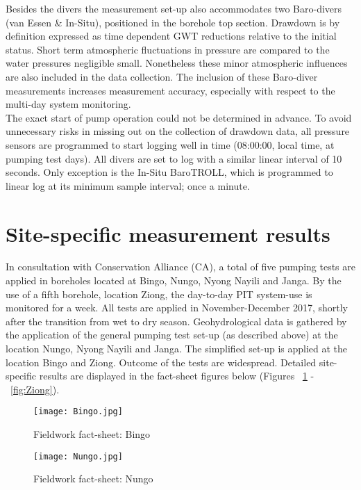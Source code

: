 Besides the divers the measurement set-up also accommodates two Baro-divers (van Essen \& In-Situ), positioned in the borehole top section. Drawdown is by definition expressed as time dependent GWT reductions relative to the initial status. Short term atmospheric fluctuations in pressure are compared to the water pressures negligible small. Nonetheless these minor atmospheric influences are also included in the data collection. The inclusion of these Baro-diver measurements increases measurement accuracy, especially with respect to the multi-day system monitoring.
\bigskip \\
The exact start of pump operation could not be determined in advance. To avoid unnecessary risks in missing out on the collection of drawdown data, all pressure sensors are programmed to start logging well in time (08:00:00, local time, at pumping test days). All divers are set to log with a similar linear interval of 10 seconds. Only exception is the In-Situ BaroTROLL, which is programmed to linear log at its minimum sample interval; once a minute. 


\section{Site-specific measurement results}
\label{section:fieldworkresults}
In consultation with Conservation Alliance (CA), a total of five pumping tests are applied in boreholes located at Bingo, Nungo, Nyong Nayili and Janga. By the use of a fifth borehole, location Ziong, the day-to-day PIT system-use is monitored for a week. All tests are applied in November-December 2017, shortly after the transition from wet to dry season. Geohydrological data is gathered by the application of the general pumping test set-up (as described above) at the location Nungo, Nyong Nayili and Janga. The simplified set-up is applied at the location Bingo and Ziong. Outcome of the tests are widespread. Detailed site-specific results are displayed in the fact-sheet figures below (Figures ~\ref{fig:Bingo} -~\ref{fig:Ziong}).

\begin{figure}[h!]
 \centering\texttt{[image: Bingo.jpg]}
 \captionsetup{justification=centering}
 \caption{Fieldwork fact-sheet: Bingo}
 \label{fig:Bingo}
\end{figure} 

\begin{figure}[h!]
 \centering\texttt{[image: Nungo.jpg]}
 \captionsetup{justification=centering}
 \caption{Fieldwork fact-sheet: Nungo}
 \label{fig:Nungo}
\end{figure} 

